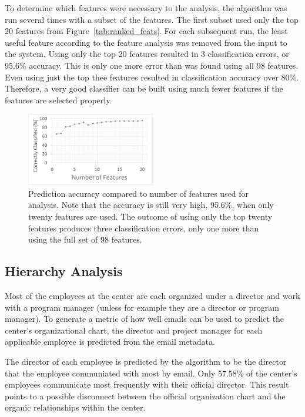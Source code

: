 \documentclass{article}
\begin{document}
To determine which features were necessary to the analysis, the algorithm was run several times with a subset of the features.  The first subset used only the top 20 features from Figure~\ref{tab:ranked_feats}.  For each subsequent run, the least useful feature according to the feature analysis was removed from the input to the system.  Using only the top 20 features resulted in 3 classification errors, or 95.6\% accuracy.  This is only one more error than was found using all 98 features.  Even using just the top thee features resulted in classification accuracy over 80\%.  Therefore, a very good classifier can be built using much fewer features if the features are selected properly.
\begin{figure}[H]
    \centering
        \includegraphics[width=0.5\textwidth]{FeatureAnalysis}
        \caption{Prediction accuracy compared to number of features used for analysis.  Note that the accuracy is still very high, 95.6\%, when only twenty features are used.  The outcome of using only the top twenty features produces three classification errors, only one more than using the full set of 98 features. }
        \label{fig:feat_analysis}
\end{figure}

\subsection{Hierarchy Analysis}
Most of the employees at the center are each organized under a director and work with a program manager (unless for example they are a director or program manager).  To generate a metric of how well emails can be used to predict the center's organizational chart, the director and project manager for each applicable employee is predicted from the email metadata. 

The director of each employee is predicted by the algorithm to be the director that the employee communiated with most by email.  Only 57.58\% of the center's employees communicate most frequently with their official director.   This result points to a possible disconnect between the official organization chart and the organic relationships within the center.
\end{document}
